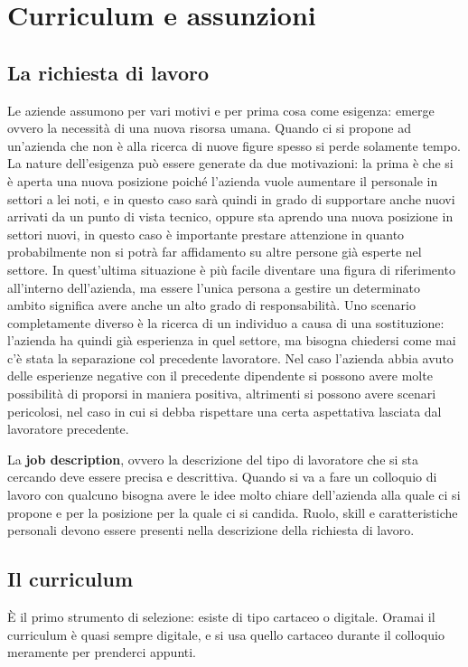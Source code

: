 \chapter{Curriculum e assunzioni}

\section{La richiesta di lavoro}
Le aziende assumono per vari motivi e per prima cosa come esigenza: emerge
ovvero la necessità di una nuova risorsa umana. Quando ci si propone ad
un'azienda che non è alla ricerca di nuove figure spesso si perde
solamente tempo. La nature dell'esigenza può essere generate da due
motivazioni: la prima è che si è aperta una nuova posizione poiché l'azienda
vuole aumentare il personale in settori a lei noti, e in questo caso sarà
quindi in grado di supportare anche nuovi arrivati da un punto di vista tecnico,
oppure sta aprendo una nuova posizione in settori nuovi, in questo
caso è importante prestare attenzione in quanto probabilmente non si potrà far
affidamento su altre persone già esperte nel settore. In quest'ultima situazione
è più facile diventare una figura di riferimento all'interno dell'azienda, ma
essere l'unica persona a gestire un determinato ambito significa avere anche un
alto grado di responsabilità. Uno scenario completamente diverso è la ricerca
di un individuo a causa di una sostituzione: l'azienda ha quindi già esperienza
in quel settore, ma bisogna chiedersi come mai c'è stata la separazione col
precedente lavoratore. Nel caso l'azienda abbia avuto delle esperienze negative
con il precedente dipendente si possono avere molte possibilità di proporsi in
maniera positiva, altrimenti si possono avere scenari pericolosi, nel caso in
cui si debba rispettare una certa aspettativa lasciata dal lavoratore
precedente.

La \textbf{job description}, ovvero la descrizione del tipo di lavoratore che
si sta cercando deve essere precisa e descrittiva. Quando si va a fare un
colloquio di lavoro con qualcuno bisogna avere le idee molto chiare
dell'azienda alla quale ci si propone e per la posizione per la quale ci si
candida. Ruolo, skill e caratteristiche personali devono essere presenti nella
descrizione della richiesta di lavoro.

\section{Il curriculum}
È il primo strumento di selezione: esiste di tipo cartaceo o digitale. Oramai
il curriculum è quasi sempre digitale, e si usa quello cartaceo durante il
colloquio meramente per prenderci appunti.

